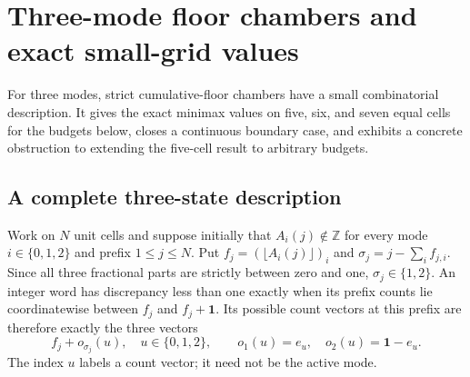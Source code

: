 \section{Three-mode floor chambers and exact small-grid values}\label{sec:floor-chambers}
For three modes, strict cumulative-floor chambers have a small
combinatorial description. It gives the exact minimax values on five, six,
and seven equal cells for the budgets below, closes a continuous boundary
case, and exhibits a concrete obstruction to extending the five-cell
result to arbitrary budgets.

\subsection{A complete three-state description}
Work on $N$ unit cells and suppose initially that $A_i(j)\notin\mathbb Z$
for every mode $i\in\{0,1,2\}$ and prefix $1\le j\le N$. Put
$f_j=(\lfloor A_i(j)\rfloor)_i$ and
$\sigma_j=j-\sum_i f_{j,i}$. Since all three fractional parts are strictly
between zero and one, $\sigma_j\in\{1,2\}$. An integer word has discrepancy
less than one exactly when its prefix counts lie coordinatewise between
$f_j$ and $f_j+\mathbf1$. Its possible count vectors at this prefix are
therefore exactly the three vectors
\begin{equation}\label{eq:floor-offset}
 f_j+o_{\sigma_j}(u),\quad u\in\{0,1,2\},\qquad
 o_1(u)=e_u,\quad o_2(u)=\mathbf1-e_u.
\end{equation}
The index $u$ labels a count vector; it need not be the active mode.

